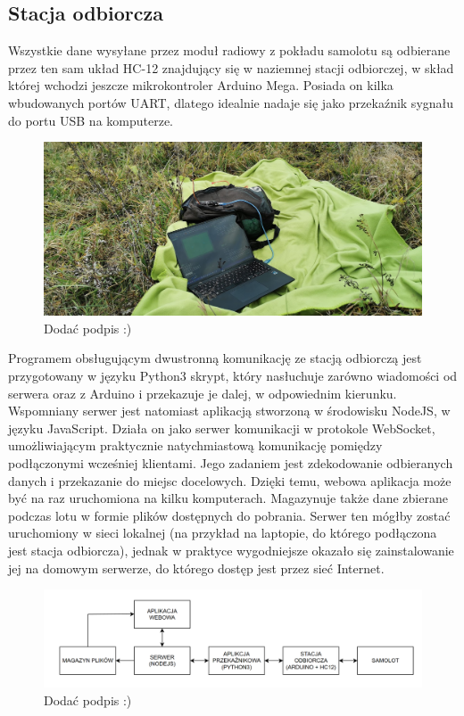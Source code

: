 \documentclass[12pt, a4paper]{article}
\begin{document}
\subsection{Stacja odbiorcza}
Wszystkie dane wysyłane przez moduł radiowy z pokładu samolotu są odbierane przez ten sam układ HC-12 znajdujący się w naziemnej stacji odbiorczej, w skład której wchodzi jeszcze mikrokontroler Arduino Mega. Posiada on kilka wbudowanych portów UART, dlatego idealnie nadaje się jako przekaźnik sygnału do portu USB na komputerze.
 \begin{figure}[ht]
    \centering
    \includegraphics[width=1\textwidth]{stacjaodbiorcza}
    \caption{Dodać podpis :)}
\end{figure}

Programem obsługującym dwustronną komunikację ze stacją odbiorczą jest przygotowany w języku Python3 skrypt, który nasłuchuje zarówno wiadomości od serwera oraz z Arduino i przekazuje je dalej, w odpowiednim kierunku. Wspomniany serwer jest natomiast aplikacją stworzoną w środowisku NodeJS, w języku JavaScript. Działa on jako serwer komunikacji w protokole WebSocket, umożliwiającym praktycznie natychmiastową komunikację pomiędzy podłączonymi wcześniej klientami. Jego zadaniem jest zdekodowanie odbieranych danych i przekazanie do miejsc docelowych. Dzięki temu, webowa aplikacja może być na raz uruchomiona na kilku komputerach. Magazynuje także dane zbierane podczas lotu w formie plików dostępnych do pobrania. Serwer ten mógłby zostać uruchomiony w sieci lokalnej (na przykład na laptopie, do którego podłączona jest stacja odbiorcza), jednak w praktyce wygodniejsze okazało się zainstalowanie jej na domowym serwerze, do którego dostęp jest przez sieć Internet.
 \begin{figure}[ht]
    \centering
    \includegraphics[width=1\textwidth]{diagram_env}
    \caption{Dodać podpis :)}
\end{figure}
\end{document}
